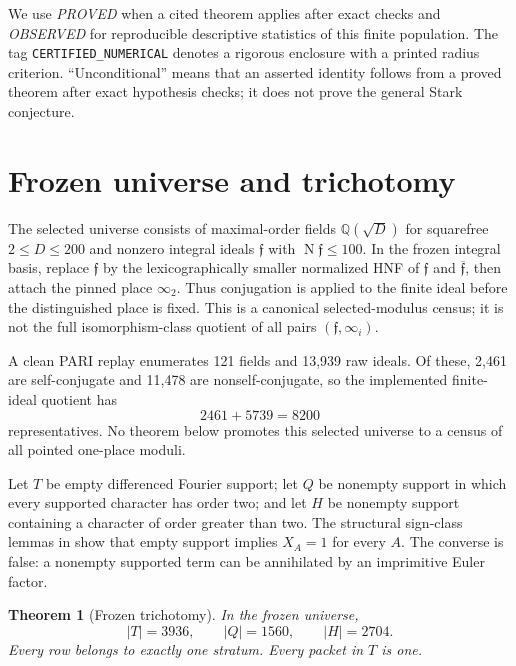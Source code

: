 \documentclass[11pt]{article}
\newtheorem{theorem}{Theorem}
\newcommand{\Q}{\mathbb Q}
\newcommand{\Norm}{\operatorname{N}}
\begin{document}
We use \emph{PROVED} when a cited theorem applies after exact checks and
\emph{OBSERVED} for reproducible descriptive statistics of this finite
population.  The tag \texttt{CERTIFIED\_NUMERICAL} denotes a rigorous
enclosure with a printed radius criterion.
``Unconditional'' means that an asserted identity follows from a proved
theorem after exact hypothesis checks; it does not prove the general
Stark conjecture.

\section{Frozen universe and trichotomy}

The selected universe consists of maximal-order fields $\Q(\sqrt D)$
for squarefree $2\leq D\leq200$ and nonzero integral ideals
$\mathfrak f$ with $\Norm\mathfrak f\leq100$.  In the frozen integral
basis, replace $\mathfrak f$ by the lexicographically smaller normalized
HNF of $\mathfrak f$ and $\overline{\mathfrak f}$, then attach the
pinned place $\infty_2$.  Thus conjugation is applied to the finite
ideal before the distinguished place is fixed.  This is a canonical
selected-modulus census; it is not the full isomorphism-class quotient
of all pairs $(\mathfrak f,\infty_i)$.

A clean PARI replay enumerates 121 fields and 13,939 raw ideals.  Of
these, 2,461 are self-conjugate and 11,478 are nonself-conjugate, so the
implemented finite-ideal quotient has
\begin{equation}\label{eq:universe-count}
 2461+5739=8200
\end{equation}
representatives.  No theorem below promotes this selected universe to
a census of all pointed one-place moduli.

Let $T$ be empty differenced Fourier support; let $Q$ be nonempty
support in which every supported character has order two; and let $H$
be nonempty support containing a character of order greater than two.
The structural sign-class lemmas in \cite{ZhaoResults} show that empty
support implies $X_A=1$ for every $A$.  The converse is false: a
nonempty supported term can be annihilated by an imprimitive Euler
factor.

\begin{theorem}[Frozen trichotomy]\label{thm:trichotomy}
In the frozen universe,
\[
 |T|=3936,\qquad |Q|=1560,\qquad |H|=2704.
\]
Every row belongs to exactly one stratum.  Every packet in $T$ is one.
\end{theorem}
\end{document}

